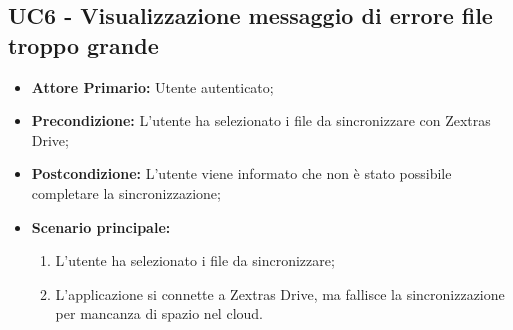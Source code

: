 \subsection{UC6 - Visualizzazione messaggio di errore file troppo grande}
\label{UC6}
\begin{itemize}
\item \textbf{Attore Primario:} Utente autenticato;
\item \textbf{Precondizione:} L'utente ha selezionato i file da sincronizzare con Zextras Drive;
\item \textbf{Postcondizione:} L'utente viene informato che non è stato possibile completare la sincronizzazione;
\item \textbf{Scenario principale:}
    \begin{enumerate}
    \item L'utente ha selezionato i file da sincronizzare;
    \item L'applicazione si connette a Zextras Drive, ma fallisce la sincronizzazione per mancanza di spazio nel cloud.
    \end{enumerate}
\end{itemize}